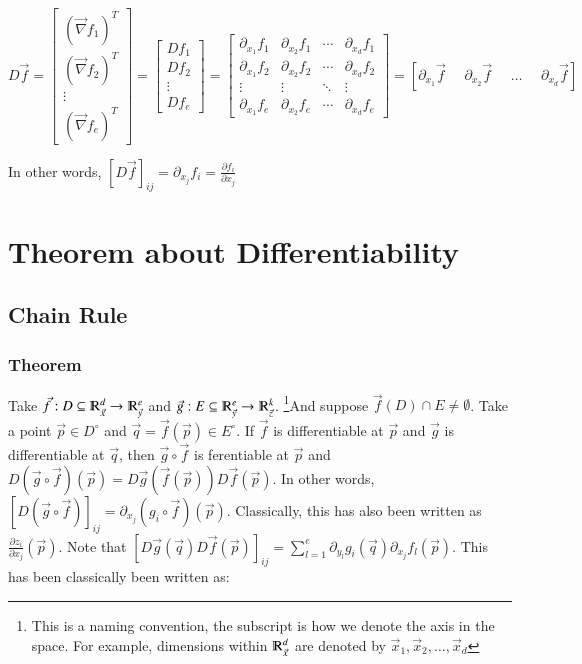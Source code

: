 \documentclass [12 pt, twoside] {book}
\newcommand\+{\text{ }}
\newcommand{\gradient}{\vec{\nabla}}
\begin{document}
\[
    D\vec{f} = \left[\begin{array}{c}
    (\gradient f_1)^T\\
    (\gradient f_2)^T\\
    \vdots\\
    (\gradient f_e)^T
    \end{array}\right] = \left[
        \begin{array}{c}
            Df_1 \\
            Df_2 \\
            \vdots\\
            Df_e
        \end{array}
    \right] = 
    \left[\begin{array}{cccc}
            \partial_{x_1} f_1 & \partial_{x_2} f_1 & \cdots &
            \partial_{x_d} f_1\\
            \partial_{x_1} f_2 & \partial_{x_2} f_2 & \cdots &
            \partial_{x_d} f_2\\
            \vdots & \vdots & \ddots & \vdots\\
            \partial_{x_1} f_e & \partial_{x_2} f_e & \cdots &
            \partial_{x_d} f_e
    \end{array}\right] =
    [\partial_{x_1} \vec{f} \+\+ \partial_{x_2} \vec{f} \+\+ \dots \+\+ \partial_{x_d}
    \vec{f}]
\]

In other words, $[D\vec{f}]_{ij} = \partial_{x_j} f_i = \frac{\partial
f_i}{\partial x_j}$

\section{Theorem about Differentiability}
\subsection{Chain Rule}
\subsubsection{Theorem}
Take $\vec{f} : D \subseteq \varmathbb{R}^d_{\vec{x}} \to
\varmathbb{R}^e_{\vec{y}}$ and $\vec{g}: E
\subseteq \varmathbb{R}^e_{\vec{y}} \to \varmathbb{R}^k_{\vec{z}}$. \footnote{This is a naming convention, the subscript
is how we denote the axis in the space. For example, dimensions within
$\varmathbb{R}^d_{\vec{x}}$ are denoted by $\vec{x}_1, \vec{x}_2, \dots,
\vec{x}_d$}And suppose $\vec{f}(D) \cap E
\neq \emptyset$. Take a point $\vec{p} \in D^\circ$ and $\vec{q} = \vec{f}(\vec{p}) \in
E^\circ$. If $\vec{f}$ is differentiable at $\vec{p}$ and $\vec{g}$ is
differentiable at $\vec{q}$, then $\vec{g} \circ \vec{f}$ is
ferentiable at $\vec{p}$ and $D(\vec{g} \circ \vec{f}) (\vec{p}) =
D\vec{g}(\vec{f}(\vec{p})) D\vec{f}(\vec{p})$. In other words, $[D(\vec{g} \circ
\vec{f})]_{ij} = \partial_{x_j}(g_i \circ \vec{f})(\vec{p})$. Classically, this
has also been written as $\frac{\partial z_i}{\partial x_j} (\vec{p})$. Note
that $[D\vec{g}(\vec{q}) D\vec{f}(\vec{p})]_{ij} = \sum_{l = 1}^e \partial_{y_l} g_i
(\vec{q}) \partial_{x_j} f_l (\vec{p})$. This has been classically been written
as:
\end{document}
